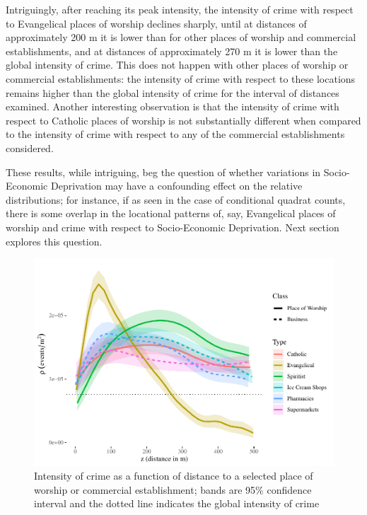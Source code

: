 \documentclass[smallextended]{svjour3}       %
\begin{document}
Intriguingly, after reaching its peak intensity, the intensity of crime
with respect to Evangelical places of worship declines sharply, until at
distances of approximately 200 m it is lower than for other places of
worship and commercial establishments, and at distances of approximately
270 m it is lower than the global intensity of crime. This does not
happen with other places of worship or commercial establishments: the
intensity of crime with respect to these locations remains higher than
the global intensity of crime for the interval of distances examined.
Another interesting observation is that the intensity of crime with
respect to Catholic places of worship is not substantially different
when compared to the intensity of crime with respect to any of the
commercial establishments considered.

These results, while intriguing, beg the question of whether variations
in Socio-Economic Deprivation may have a confounding effect on the
relative distributions; for instance, if as seen in the case of
conditional quadrat counts, there is some overlap in the locational
patterns of, say, Evangelical places of worship and crime with respect
to Socio-Economic Deprivation. Next section explores this question.

\begin{figure}
\centering
\includegraphics{Moral_Communities_and_Crime_files/figure-latex/figure-plot-relative-distribution-1.pdf}
\caption{\label{fig:plot-relative-distribution}Intensity of crime as a
function of distance to a selected place of worship or commercial
establishment; bands are 95\% confidence interval and the dotted line
indicates the global intensity of crime}
\end{figure}
\end{document}
